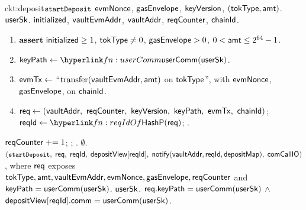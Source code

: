 \begin{CktBox}{ckt:deposit}{$\texttt{\small startDeposit}$}
 $\mathsf{evmNonce}$, $\mathsf{gasEnvelope}$, $\mathsf{keyVersion}$, $(\mathsf{tokType}, \mathsf{amt})$.
 $\mathsf{userSk}$.
 $\mathsf{initialized}$, $\mathsf{vaultEvmAddr}$, $\mathsf{vaultAddr}$, $\mathsf{reqCounter}$, $\mathsf{chainId}$.
\begin{enumerate}[nosep,leftmargin=1.7em,topsep=2pt]
\item $\textbf{assert}~ \mathsf{initialized} \geq 1$, \; $\mathsf{tokType} \neq 0$, \; $\mathsf{gasEnvelope} > 0$, \;
      $0 < \mathsf{amt} \leq 2^{64}-1$.
\item $\keyPath \gets \lnk{fn:userComm}{\userComm(\usersk)}$.
\item $\mathsf{evmTx} \gets$ ``$\text{transfer}(\mathsf{vaultEvmAddr}, \mathsf{amt})$ on $\mathsf{tokType}$'', with $\mathsf{evmNonce}$,
      $\mathsf{gasEnvelope}$, on $\mathsf{chainId}$.
\item $\req \gets (\vaultAddr\bc \sigNonce\bc \keyVer\bc \keyPath\bc \evmTxOf\bc \chainId)$; \;
      $\rid \gets \lnk{fn:reqIdOf}{\reqIdOf(\req)}$; \;
      \ADDEDINL{$\assert \rid \notin \depositMap$}.
\end{enumerate}
\begin{OutList}
\oitem{\Dvault} $\mathsf{reqCounter} \mathrel{+}= 1$; \; \ADDEDINL{$\depositMap[\rid] \gets \req$}; \;
  \ADDEDINL{$\depositView[\rid] \gets (\keyPath,\; \tokType,\; \amt)$}.
\oitem{\Dshd} $\emptyset$.
\oitem{\stmt} $(\texttt{\small startDeposit},\; \mathsf{req},\; \mathsf{reqId},\; \mathsf{depositView}[\mathsf{reqId}],\;
  \mathsf{notify}(\mathsf{vaultAddr}, \mathsf{reqId}, \mathsf{depositMap}),\; \mathsf{comCallIO})$, where $\mathsf{req}$ exposes
  $\mathsf{tokType}, \mathsf{amt}, \mathsf{vaultEvmAddr}, \mathsf{evmNonce}, \mathsf{gasEnvelope}, \mathsf{reqCounter}$ and
  $\mathsf{keyPath} = \mathsf{userComm}(\mathsf{userSk})$.
\oitem{\wit} $\mathsf{userSk}$.
\oitem{\Rel} $\mathsf{req}.\mathsf{keyPath} = \mathsf{userComm}(\mathsf{userSk})$ \;$\wedge$\;
  $\mathsf{depositView}[\mathsf{reqId}].\mathsf{comm} = \mathsf{userComm}(\mathsf{userSk})$.
\end{OutList}
\end{CktBox}


